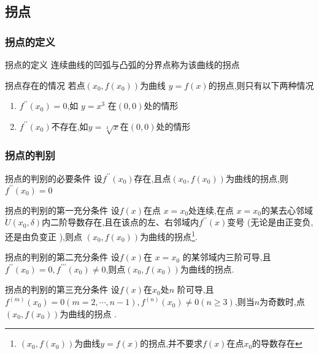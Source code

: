 \documentclass[8pt a4paper, oneside, UTF8]{ctexbook}  %
\begin{document}
\begin{sloppypar}
    \subsection{拐点}
    \subsubsection{拐点的定义}
    \begin{defn}{拐点的定义}{}
        连续曲线的凹弧与凸弧的分界点称为该曲线的拐点
    \end{defn}
    \begin{criterion}{拐点存在的情况}{}
        若点$(x_0,f(x_0))$为曲线 $y=f(x)$的拐点,则只有以下两种情况
        \begin{enumerate}
            \item $f^{\prime\prime}\left(x_{0}\right)=0$,如 $y=x^{3}$ 在$\left(0,0\right)$处的情形
            \item $f^{\prime\prime}(x_0)$不存在,如$y=\sqrt[3]{x}$在$(0,0)$处的情形
        \end{enumerate}
    \end{criterion}
    \subsubsection{拐点的判别}
    \begin{defn}{拐点的判别的必要条件}{}
        设$f^{\prime\prime}(x_0)$存在,且点$(x_0,f(x_0))$为曲线的拐点,则$f^{\prime\prime}(x_0)=0$
    \end{defn}
    \begin{defn}{拐点的判别的第一充分条件}{}
        设$f(x)$在点 $x=x_0$处连续,在点 $x=x_0$的某去心邻域$\mathring U(x_0,\delta)$内二阶导数存在,且在该点的左、右邻域内$f^{\prime\prime}(x)$变号 (无论是由正变负,还是由负变正 ),则点 $(x_0,f(x_0))$为曲线的拐点\footnote{$(x_0,f(x_0))$为曲线$y=f(x)$的拐点,并不要求$f(x)$在点$x_0$的导数存在}.
    \end{defn}
    \begin{defn}{拐点的判别的第二充分条件}{}
        设$f(x)$在 $x=x_0$ 的某邻域内三阶可导,且$f^{\prime\prime}(x_0)=0,f^{\prime\prime\prime}(x_0)\neq0$,则点$(x_0,f(x_0))$为曲线的拐点.
    \end{defn}
    \begin{defn}{拐点的判别的第三充分条件}{}
        设$f(x)$在$x_0$处$n$ 阶可导,且$f^{(m)}(x_0)=0(m=2,\cdots,n-1),f^{(n)}(x_0)\neq0(n\geqslant3)$,则当$n$为奇数时,点$(x_0,f(x_0))$为曲线的拐点 .
    \end{defn}    

\end{sloppypar}
\end{document}

